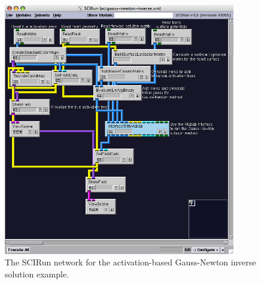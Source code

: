 \documentclass[fleqn,11pt,openany]{book}
\begin{document}
\begin{figure}[H]
\begin{center}
\includegraphics[width=0.9\textwidth]{ECGToolkitGuide_figures/actgaussnewtonnetwork.png}
\caption{The SCIRun network for the activation-based Gauss-Newton inverse solution example.}
\label{GaussNewtonNetworkExample}
\end{center}
\end{figure}
\end{document}

